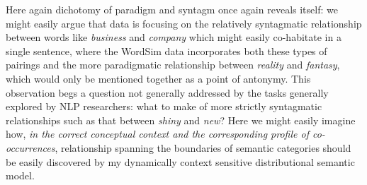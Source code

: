Here again  dichotomy of paradigm and syntagm once again reveals itself: we might easily argue that  data is focusing on the relatively syntagmatic relationship between words like \emph{business} and \emph{company} which might easily co-habitate in a single sentence, where the WordSim data incorporates both these types of pairings and the more paradigmatic relationship between \emph{reality} and \emph{fantasy}, which would only be mentioned together as a point of antonymy.  This observation begs a question not generally addressed by the tasks generally explored by NLP researchers: what to make of more strictly syntagmatic relationships such as that between \emph{shiny} and \emph{new}?  Here we might easily imagine how, \emph{in the correct conceptual context and the corresponding profile of co-occurrences}, relationship spanning the boundaries of semantic categories should be easily discovered by my dynamically context sensitive distributional semantic model.
